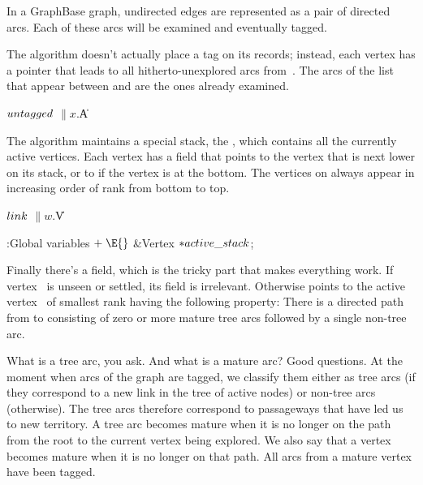 In a GraphBase graph, undirected edges are represented as a pair of directed
arcs. Each of these arcs will be examined and eventually tagged.

The algorithm doesn't actually place a tag on its  records;
instead,
each vertex  has a pointer  that leads to all
hitherto-unexplored arcs from~. The arcs of the list that appear
between  and  are the ones
already examined.

\Y\B\4\D$\\{untagged}$ \5
$\|x.{}$\|A\par
\fi

The algorithm maintains a special stack, the ,
which contains
all the currently active vertices. Each vertex has a  field that
points
to the vertex that is next lower on its stack, or to \PB{$\NULL$} if the vertex
is
at the bottom. The vertices on  always appear in
increasing
order of rank from bottom to top.

\Y\B\4\D$\\{link}$ \5
$\|w.{}$\|V\par
\Y\B\4:Global variables\X${}\mathrel+\E{}$\6
\&{Vertex} ${}{*}\\{active\_stack}{}$;\par
\fi

Finally there's a  field, which is the tricky part that makes
everything work. If vertex~ is unseen or settled, its 
field is
irrelevant. Otherwise  points to the active vertex~
of smallest rank having the following property:
There is a directed path from  to  consisting of
zero or more mature tree arcs followed by a single non-tree arc.

What is a tree arc, you ask. And what is a mature arc? Good questions. At the
moment when arcs of the graph are tagged, we classify them either as tree
arcs (if they correspond to a new  link in the tree of active
nodes) or non-tree arcs (otherwise). The tree arcs therefore correspond to
passageways that have led us to new territory. A tree arc becomes mature
when it is no longer on the path from the root to the current vertex being
explored. We also say that a vertex becomes mature when it is
no longer on that path. All arcs from a mature vertex have been tagged.

